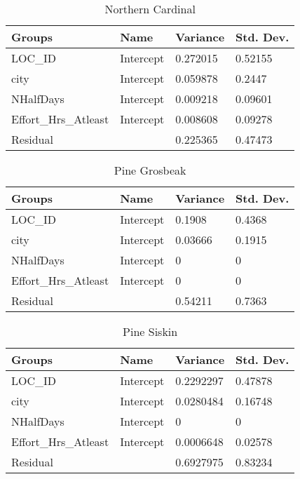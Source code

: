 \begin{longtable}[c]{|l|l|l|l|}
\caption{Northern Cardinal}
\label{my-label}\\
\hline
Groups               & Name      & Variance & Std. Dev. \\ \hline
\endhead
%
LOC\_ID              & Intercept & 0.272015 & 0.52155   \\ \hline
city                 & Intercept & 0.059878 & 0.2447    \\ \hline
NHalfDays            & Intercept & 0.009218 & 0.09601   \\ \hline
Effort\_Hrs\_Atleast & Intercept & 0.008608 & 0.09278   \\ \hline
Residual             &           & 0.225365 & 0.47473   \\ \hline
\end{longtable}

\begin{longtable}[c]{|l|l|l|l|}
\caption{Pine Grosbeak}
\label{my-label}\\
\hline
Groups               & Name      & Variance & Std. Dev. \\ \hline
\endhead
%
LOC\_ID              & Intercept & 0.1908   & 0.4368    \\ \hline
city                 & Intercept & 0.03666  & 0.1915    \\ \hline
NHalfDays            & Intercept & 0        & 0         \\ \hline
Effort\_Hrs\_Atleast & Intercept & 0        & 0         \\ \hline
Residual             &           & 0.54211  & 0.7363    \\ \hline
\end{longtable}

\begin{longtable}[c]{|l|l|l|l|}
\caption{Pine Siskin}
\label{my-label}\\
\hline
Groups               & Name      & Variance  & Std. Dev. \\ \hline
\endhead
%
LOC\_ID              & Intercept & 0.2292297 & 0.47878   \\ \hline
city                 & Intercept & 0.0280484 & 0.16748   \\ \hline
NHalfDays            & Intercept & 0         & 0         \\ \hline
Effort\_Hrs\_Atleast & Intercept & 0.0006648 & 0.02578   \\ \hline
Residual             &           & 0.6927975 & 0.83234   \\ \hline
\end{longtable}

